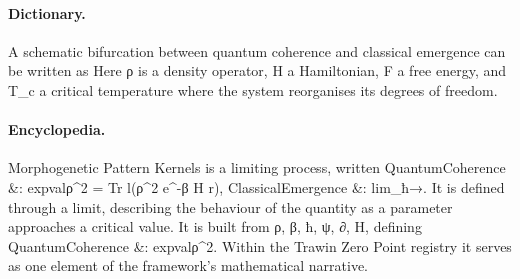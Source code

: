 \paragraph{Dictionary.}
A schematic bifurcation between quantum coherence and classical emergence can be written as Here ρ is a density operator, H a Hamiltonian, F a free energy, and T\_c a critical temperature where the system reorganises its degrees of freedom.

\paragraph{Encyclopedia.}
Morphogenetic Pattern Kernels is a limiting process, written QuantumCoherence \&: expvalρ\textasciicircum{}2 = Tr l(ρ\textasciicircum{}2 e\textasciicircum{}-β H r), ClassicalEmergence \&: lim\_ħ→. It is defined through a limit, describing the behaviour of the quantity as a parameter approaches a critical value. It is built from ρ, β, ħ, ψ, ∂, H, defining QuantumCoherence \&: expvalρ\textasciicircum{}2. Within the Trawin Zero Point registry it serves as one element of the framework's mathematical narrative.
